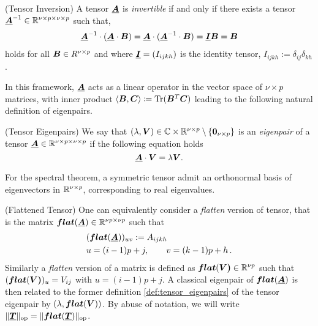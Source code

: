 \begin{definition}(Tensor Inversion) A tensor ${\underline{\bm{A}}}$ is \emph{invertible} if and only if there exists a tensor ${\underline{\bm{A}}}^{-1}\in\mathbb{R}^{\nu\times p \times \nu \times p}$ such that, 
\begin{align}
    {\ensuremath{\underline{\bm{A}}}}^{-1}\cdot({\underline{\bm{A}}}\cdot\bm{B}) = {\underline{\bm{A}}}\cdot({\underline{\bm{A}}}^{-1}\cdot\bm{B}) = {\underline{\bm{I}}}\bm{B} = \bm{B}
\end{align}
holds for all $\bm{B}\in\mathbb \mathbb{R}^{\nu\times p} $ and where ${\underline{\bm{I}}}= (I_{ijkh})$ is the identity tensor, $I_{ijkh}:= \delta_{ij}\delta_{kh}$.
\end{definition}
 In this framework, ${\underline{\bm{A}}}$ acts as a linear operator in the vector space of $\nu\times p$ matrices, with inner product $\langle\bm{B},\bm{C}\rangle \coloneqq {\rm Tr}(\bm{B}^T\bm{C})$ leading to the following natural definition of eigenpairs.
\begin{definition}\label{def:tensor_eigenpairs}(Tensor Eigenpairs)  We say that $(\lambda, \bm{V}) \in \mathbb{C} \times \mathbb{R}^{\nu \times p}\setminus \{\bm{0}_{\nu \times p}\}$ is an \emph{eigenpair} of a tensor ${\underline{\bm{A}}} \in \mathbb{R}^{\nu \times p \times \nu \times p}$ if the following equation holds
\begin{equation}
    {\ensuremath{\underline{\bm{A}}}}\cdot\bm{V} = \lambda \bm{V}.
\end{equation}
\end{definition}
For the spectral theorem, a symmetric tensor admit an orthonormal basis of eigenvectors in $\mathbb{R}^{\nu\times p}$, corresponding to real eigenvalues.

\begin{remark}(Flattened Tensor) One can equivalently consider a \emph{flatten} version of tensor, that is the matrix $\bm{flat}({\underline{\bm{A}}}) \in \mathbb{R}^{\nu p \times \nu p}$ such that
\begin{align}
    &(\bm{flat}({\underline{\bm{A}}}))_{uv} := A_{ijkh} \notag\\ & u=(i-1)p+j, \qquad v =(k-1)p+h \, .
\end{align}
Similarly a \emph{flatten} version of a matrix is defined as $\bm{flat}(\bm{V)} \in \mathbb{R}^{\nu p}$ such that $(\bm{flat}(\bm{V)} )_{u} = V_{ij}$ with $ u=(i-1)p+j$.  A classical eigenpair of $\bm{flat}({\underline{\bm{A}}})$ is then related to the former definition \ref{def:tensor_eigenpairs} of the tensor eigenpair by $(\lambda, \bm{flat}(\bm{V}) )$. By abuse of notation, we will write $ \|{\underline{\bm{T}}} \|_{\mathrm{op}}  =  \|\bm{flat}({\underline{\bm{T}}}) \|_{\mathrm{op}} $. 
\end{remark}


